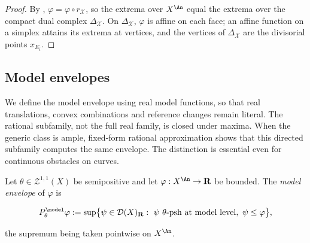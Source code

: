 \begin{proof}
By , \(\varphi=\varphi\circ r_{\mathcal X}\),
so the extrema over \(X^{\An}\) equal the extrema over the compact dual
complex \(\Delta_{\mathcal X}\).  On \(\Delta_{\mathcal X}\), \(\varphi\) is
affine on each face; an affine function on a simplex attains its extrema at
vertices, and the vertices of \(\Delta_{\mathcal X}\) are the divisorial
points \(x_{E_i}\).
\end{proof}

\subsection{Model envelopes}
\label{sec:ch20-envelopes}

We define the model envelope using real model functions, so that real
translations, convex combinations and reference changes remain literal.
The rational subfamily, not the full real family, is closed under maxima.
When the generic class is ample, fixed-form rational approximation shows
that this directed subfamily computes the same envelope.  The distinction
is essential even for continuous obstacles on curves.

\begin{definition}
\label{def:ch20-model-envelope}
Let \(\theta\in\mathcal Z^{1,1}(X)\) be semipositive and let
\(\varphi:X^{\An}\to\mathbf R\) be bounded.  The \emph{model envelope} of
\(\varphi\) is

\begin{equation}
\label{eq:ch20-model-envelope}
 P^{\model}_\theta\varphi
 :=\sup\bigl\{\psi\in\mathcal D(X)_{\mathbf R}:\
   \psi\ \theta\text{-psh at model level},\ \psi\leq\varphi\bigr\},
\end{equation}

the supremum being taken pointwise on \(X^{\An}\).
\end{definition}

